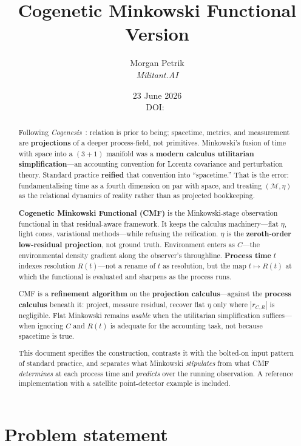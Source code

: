 \documentclass[11pt,a4paper]{article}
\title{%
  \textbf{Cogenetic Minkowski Functional}\\[0.4em]
  \large Version \docversion
}
\author{%
  Morgan Petrik\\[0.35em]
  {\itshape Militant.AI}%
}
\date{%
  23 June 2026\\[0.6em]
  {\small DOI:~\href{https://doi.org/\docdoi}{\docdoi}}%
}
\newcommand{\M}{\mathcal{M}}
\begin{document}
\maketitle

\begin{abstract}
Following \emph{Cogenesis}~\cite{petrik2026cogenesis}: relation is prior to being; spacetime, metrics, and measurement are \textbf{projections} of a deeper process-field, not primitives. Minkowski's fusion of time with space into a $(3{+}1)$ manifold was a \textbf{modern calculus utilitarian simplification}---an accounting convention for Lorentz covariance and perturbation theory. Standard practice \textbf{reified} that convention into ``spacetime.'' That is the error: fundamentalising time as a fourth dimension on par with space, and treating $(\M,\eta)$ as the relational dynamics of reality rather than as projected bookkeeping.

\textbf{Cogenetic Minkowski Functional (CMF)} is the Minkowski-stage observation functional in that residual-aware framework. It keeps the calculus machinery---flat $\eta$, light cones, variational methods---while refusing the reification. $\eta$ is the \textbf{zeroth-order low-residual projection}, not ground truth. Environment enters as \textbf{$C$}---the environmental density gradient along the observer's throughline. \textbf{Process time} $t$ indexes resolution \textbf{$R(t)$}---not a rename of $t$ as resolution, but the map $t \mapsto R(t)$ at which the functional is evaluated and sharpens as the process runs.

CMF is a \textbf{refinement algorithm} on the \textbf{projection calculus}---against the \textbf{process calculus} beneath it: project, measure residual, recover flat $\eta$ only where $|r_{C,R}|$ is negligible. Flat Minkowski remains \emph{usable} when the utilitarian simplification suffices---when ignoring $C$ and $R(t)$ is adequate for the accounting task, not because spacetime is true.

This document specifies the construction, contrasts it with the bolted-on input pattern of standard practice, and separates what Minkowski \emph{stipulates} from what CMF \emph{determines} at each process time and \emph{predicts} over the running observation. A reference implementation with a satellite point-detector example is included.
\end{abstract}

\section{Problem statement}
\end{document}
